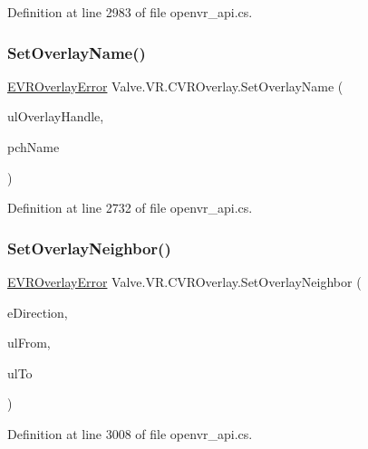 Definition at line 2983 of file openvr\+\_\+api.\+cs.

\mbox{\label{class_valve_1_1_v_r_1_1_c_v_r_overlay_ae759f9f42507c41ad025441db77102b0}} 
\subsubsection{\texorpdfstring{SetOverlayName()}{SetOverlayName()}}
{\footnotesize\ttfamily \mbox{\hyperlink{namespace_valve_1_1_v_r_aaee5c5144f42b7969d45b854f51b0c18}{E\+V\+R\+Overlay\+Error}} Valve.\+V\+R.\+C\+V\+R\+Overlay.\+Set\+Overlay\+Name (\begin{DoxyParamCaption}\item[{ulong}]{ul\+Overlay\+Handle,  }\item[{string}]{pch\+Name }\end{DoxyParamCaption})}



Definition at line 2732 of file openvr\+\_\+api.\+cs.

\mbox{\label{class_valve_1_1_v_r_1_1_c_v_r_overlay_a3f67978e98a9ed092e42e0354f5031d9}} 
\subsubsection{\texorpdfstring{SetOverlayNeighbor()}{SetOverlayNeighbor()}}
{\footnotesize\ttfamily \mbox{\hyperlink{namespace_valve_1_1_v_r_aaee5c5144f42b7969d45b854f51b0c18}{E\+V\+R\+Overlay\+Error}} Valve.\+V\+R.\+C\+V\+R\+Overlay.\+Set\+Overlay\+Neighbor (\begin{DoxyParamCaption}\item[{\mbox{\hyperlink{namespace_valve_1_1_v_r_ad0398c1325c370eb3a4796d89610b868}{E\+Overlay\+Direction}}}]{e\+Direction,  }\item[{ulong}]{ul\+From,  }\item[{ulong}]{ul\+To }\end{DoxyParamCaption})}



Definition at line 3008 of file openvr\+\_\+api.\+cs.

